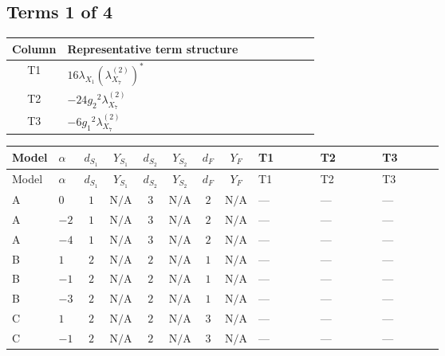 \documentclass[8pt]{article}
\begin{document}
\begin{landscape}
\subsection*{Terms 1 of 4}
\begin{center}
\begin{tabular}{@{}c >{\raggedright\arraybackslash}p{0.82\linewidth}@{}}
\toprule
Column & Representative term structure \\
\midrule
T1 & \(\displaystyle 16 {\lambda_{X_{1}}} \left({\lambda_{X_{7}}^{(2)}}\right)^{*}\) \\
\midrule
T2 & \(\displaystyle -24 {g_2}^2 {\lambda_{X_{7}}^{(2)}}\) \\
\midrule
T3 & \(\displaystyle -6 {g_1}^2 {\lambda_{X_{7}}^{(2)}}\) \\
\midrule
\bottomrule
\end{tabular}
\end{center}
\smallskip
\tiny
\begin{longtable}{@{}llcccccc >{\raggedright\arraybackslash}p{0.21\linewidth} >{\raggedright\arraybackslash}p{0.21\linewidth} >{\raggedright\arraybackslash}p{0.21\linewidth}@{}}
\toprule
Model & $\alpha$ & $d_{S_1}$ & $Y_{S_1}$ & $d_{S_2}$ & $Y_{S_2}$ & $d_F$ & $Y_F$ & T1 & T2 & T3 \\
\midrule
\endfirsthead
\toprule
Model & $\alpha$ & $d_{S_1}$ & $Y_{S_1}$ & $d_{S_2}$ & $Y_{S_2}$ & $d_F$ & $Y_F$ & T1 & T2 & T3 \\
\midrule
\endhead
A & $0$ & $1$ & $\text{N/A}$ & $3$ & $\text{N/A}$ & $2$ & $\text{N/A}$ & --- & --- & --- \\
\midrule
A & $-2$ & $1$ & $\text{N/A}$ & $3$ & $\text{N/A}$ & $2$ & $\text{N/A}$ & --- & --- & --- \\
\midrule
A & $-4$ & $1$ & $\text{N/A}$ & $3$ & $\text{N/A}$ & $2$ & $\text{N/A}$ & --- & --- & --- \\
\midrule
B & $1$ & $2$ & $\text{N/A}$ & $2$ & $\text{N/A}$ & $1$ & $\text{N/A}$ & --- & --- & --- \\
\midrule
B & $-1$ & $2$ & $\text{N/A}$ & $2$ & $\text{N/A}$ & $1$ & $\text{N/A}$ & --- & --- & --- \\
\midrule
B & $-3$ & $2$ & $\text{N/A}$ & $2$ & $\text{N/A}$ & $1$ & $\text{N/A}$ & --- & --- & --- \\
\midrule
C & $1$ & $2$ & $\text{N/A}$ & $2$ & $\text{N/A}$ & $3$ & $\text{N/A}$ & --- & --- & --- \\
\midrule
C & $-1$ & $2$ & $\text{N/A}$ & $2$ & $\text{N/A}$ & $3$ & $\text{N/A}$ & --- & --- & --- \\

\end{longtable}
\end{landscape}
\end{document}
